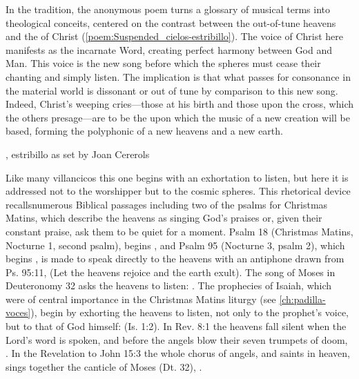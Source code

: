 In the  tradition, the anonymous poem turns a glossary of
musical terms into theological conceits, centered on the contrast between the
out-of-tune heavens and the  of Christ
(\cref{poem:Suspended_cielos-estribillo}).
The voice of Christ here manifests as the incarnate Word, creating
perfect harmony between God and Man. 
This voice is the new song before which the spheres must cease their chanting
and simply listen.
The implication is that what passes for consonance in the material world is
dissonant or out of tune by comparison to this new song.
Indeed, Christ's weeping cries---those at his birth and those upon the cross,
which the others presage---are to be the  upon which the
music of a new creation will be based, forming the polyphonic 
of a new heavens and a new earth.

{, estribillo as set by Joan Cererols}

Like many villancicos this one begins with an exhortation to listen, but here it
is addressed not to the worshipper but to the cosmic spheres. 
This rhetorical device recallsnumerous Biblical passages including two of the
psalms for Christmas Matins, which describe the heavens as singing God's praises
or, given their constant praise, ask them to be quiet for a moment.
Psalm 18 (Christmas Matins, Nocturne 1, second psalm), begins , and Psalm 95 (Nocturne 3, psalm 2), which
begins , is made to speak directly
to the heavens with an antiphone drawn from Ps. 95:11,  (Let the heavens rejoice and the earth exult).%
    \Autocite[169--179]{Catholic:Breviarium1631}
The song of Moses in Deuteronomy 32 asks the heavens to listen: . 
The prophecies of Isaiah, which were of central importance in the Christmas
Matins liturgy (see \cref{ch:padilla-voces}), begin by exhorting the heavens to
listen, not only to the prophet's voice, but to that of God himself:
 (Is. 1:2).
In Rev. 8:1 the heavens fall silent when the Lord's word is spoken, and before
the angels blow their seven trumpets of doom, .
In the Revelation to John 15:3 the whole chorus of angels,  and saints in heaven, sings together the canticle of Moses (Dt. 32),
.

